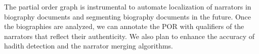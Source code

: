 \documentclass[11pt]{article}
\begin{document}
The partial order graph is instrumental to automate
localization of narrators in biography documents and
segmenting biography documents in the future.
Once the biographies are analyzed, we can annotate
the POR with qualifiers of the narrators that reflect
their authenticity. 
We also plan to 
enhance the accuracy of hadith detection and the 
narrator merging algorithms. 











%

{\small }
\end{document}
